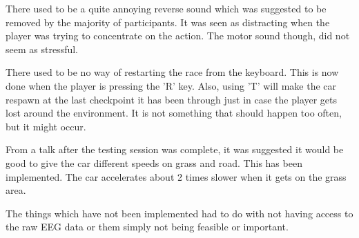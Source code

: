 There used to be a quite annoying reverse sound which was suggested to be removed by the majority of participants. It was seen as distracting when the player was trying to concentrate on the action. The motor sound though, did not seem as stressful.

There used to be no way of restarting the race from the keyboard. This is now done when the player is pressing the 'R' key. Also, using 'T' will make the car respawn at the last checkpoint it has been through just in case the player gets lost around the environment. It is not something that should happen too often, but it might occur.

From a talk after the testing session was complete, it was suggested it would be good to give the car different speeds on grass and road. This has been implemented. The car accelerates about 2 times slower when it gets on the grass area.

The things which have not been implemented had to do with not having access to the raw EEG data or them simply not being feasible or important.